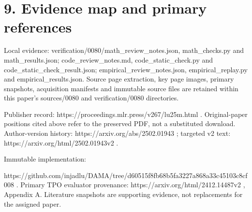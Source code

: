 \documentclass[10pt]{article}
\begin{document}
\section*{9. Evidence map and primary references}
Local evidence: verification/0080/math\_review\_notes.json, math\_checks.py and math\_results.json; code\_review\_notes.md, code\_static\_check.py and code\_static\_check\_result.json; empirical\_review\_notes.json, empirical\_replay.py and empirical\_results.json. Source page extraction, key page images, primary snapshots, acquisition manifests and immutable source files are retained within this paper’s sources/0080 and verification/0080 directories.\par
Publisher record: https://proceedings.mlr.press/v267/lu25m.html . Original-paper positions cited above refer to the preserved PDF, not a substituted download. Author-version history: https://arxiv.org/abs/2502.01943 ; targeted v2 text: https://arxiv.org/html/2502.01943v2 .\par
Immutable implementation:\par
https://github.com/injadlu/DAMA/tree/d60515f8fb68b5fa3227a868a33c45103c8cf008 . Primary TPO evaluator provenance: https://arxiv.org/html/2412.14487v2 , Appendix A. Literature snapshots are supporting evidence, not replacements for the assigned paper.\par
\end{document}
